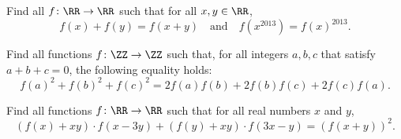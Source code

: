 \documentclass[11pt]{scrartcl}
\begin{document}
\begin{problem}
  Find all $f\colon \RR \to \RR$ such that for all $x,y\in \RR$,
  \[ f(x)+f(y) = f(x+y) \quad\text{and}\quad f(x^{2013}) = f(x)^{2013}. \]
\end{problem}

\begin{problem}
  [IMO 2012/4]
  Find all functions $f\colon \ZZ \to \ZZ$ such that,
  for all integers $a,b,c$ that satisfy $a+b+c=0$, the following equality holds:
  \[f(a)^2+f(b)^2+f(c)^2=2f(a)f(b)+2f(b)f(c)+2f(c)f(a).\]
\end{problem}

\begin{problem}
  [USAMO 2016/4]
  Find all functions $f\colon \RR \to \RR$
  such that for all real numbers $x$ and $y$,
  \[ (f(x)+xy)\cdot f(x-3y)+(f(y)+xy)\cdot f(3x-y)=(f(x+y))^2. \]
\end{problem}
\end{document}

